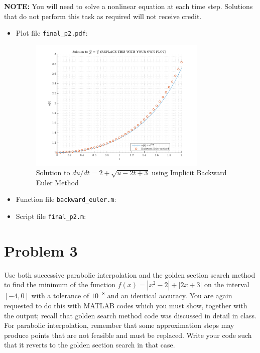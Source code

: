 \textbf{NOTE:} You will need to solve a nonlinear equation at each time step. Solutions that do not perform this task as required will not receive credit.
\begin{solution}
  \quad
   \begin{itemize}
    \item Plot file \verb|final_p2.pdf|:
      \begin{figure}[!hbtp]
        \centering
        \includegraphics[width=0.8\textwidth]{../src/final_p2.pdf}
        \caption{Solution to $du / dt = 2 + \sqrt{u - 2t + 3}$ using Implicit Backward Euler Method}
        \label{fig:}
      \end{figure}
    \item Function file \verb|backward_euler.m|:
      
    \item Script file \verb|final_p2.m|:
      
  \end{itemize}
\end{solution}

\section{Problem 3}%
\label{sec:problem_3}
Use both successive parabolic interpolation and the golden section search method to find the minimum of the function $f(x) = |x^{2} - 2| + |2x + 3|$ on the interval $[-4, 0]$ with a tolerance of $10^{-8}$ and an identical accuracy. You are again requested to do this with MATLAB codes which you must show, together with the output; recall that golden search method code was discussed in detail in class. For parabolic interpolation, remember that some approximation steps may produce points that are not feasible and must be replaced. Write your code such that it reverts to the golden section search in that case.

